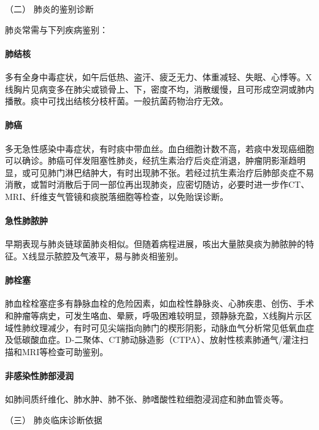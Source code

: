 \hypertarget{text00272.htmlux5cux23CHP9-5-2-1-2}{}
（二） 肺炎的鉴别诊断

肺炎常需与下列疾病鉴别：

\paragraph{肺结核}

多有全身中毒症状，如午后低热、盗汗、疲乏无力、体重减轻、失眠、心悸等。X线胸片见病变多在肺尖或锁骨上、下，密度不均，消散缓慢，且可形成空洞或肺内播散。痰中可找出结核分枝杆菌。一般抗菌药物治疗无效。

\paragraph{肺癌}

多无急性感染中毒症状，有时痰中带血丝。血白细胞计数不高，若痰中发现癌细胞可以确诊。肺癌可伴发阻塞性肺炎，经抗生素治疗后炎症消退，肿瘤阴影渐趋明显，或可见肺门淋巴结肿大，有时出现肺不张。若经过抗生素治疗后肺部炎症不易消散，或暂时消散后于同一部位再出现肺炎，应密切随访，必要时进一步作CT、MRI、纤维支气管镜和痰脱落细胞等检查，以免贻误诊断。

\paragraph{急性肺脓肿}

早期表现与肺炎链球菌肺炎相似。但随着病程进展，咳出大量脓臭痰为肺脓肿的特征。X线显示脓腔及气液平，易与肺炎相鉴别。

\paragraph{肺栓塞}

肺血栓栓塞症多有静脉血栓的危险因素，如血栓性静脉炎、心肺疾患、创伤、手术和肿瘤等病史，可发生咯血、晕厥，呼吸困难较明显，颈静脉充盈，X线胸片示区域性肺纹理减少，有时可见尖端指向肺门的楔形阴影，动脉血气分析常见低氧血症及低碳酸血症。D-二聚体、CT肺动脉造影（CTPA）、放射性核素肺通气/灌注扫描和MRI等检查可助鉴别。

\paragraph{非感染性肺部浸润}

如肺间质纤维化、肺水肿、肺不张、肺嗜酸性粒细胞浸润症和肺血管炎等。

\hypertarget{text00272.htmlux5cux23CHP9-5-2-1-3}{}
（三） 肺炎临床诊断依据

